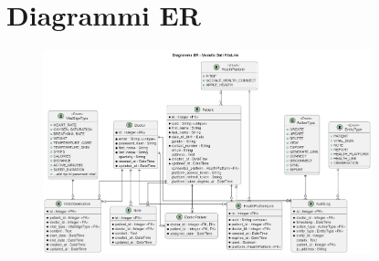 \documentclass[12pt,a4paper,oneside]{report}
\begin{document}
\section{Diagrammi ER}
\begin{figure}[H]
    \centering
    \includegraphics[width=0.85\textwidth]{images/uml/DataModel.png}
\end{figure}
\end{document}
